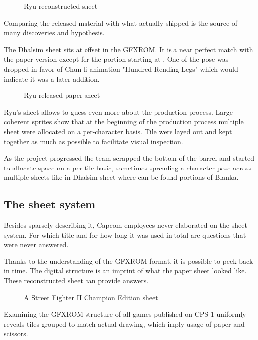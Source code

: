 \begin{figure}[H]
\caption*{Ryu reconstructed sheet}
\end{figure}


Comparing the released material with what actually shipped is the source of many discoveries and hypothesis. 

The Dhalsim sheet sits at offset  in the GFXROM. It is a near perfect match with the paper version except for the portion starting at . One of the pose was dropped in favor of Chun-li animation "Hundred Rending Legs" which would indicate it was a later addition. 

 \begin{figure}[H]
\caption*{Ryu released paper sheet}
\end{figure}

Ryu's sheet  allows to guess even more about the production process. Large coherent sprites show that at the beginning of the production process multiple sheet were allocated on a per-character basis. Tile were layed out and kept together as much as possible to facilitate visual inspection.

As the project progressed the team scrapped the bottom of the barrel and started to allocate space on a per-tile basic, sometimes spreading a character pose across multiple sheets like in Dhalsim sheet where can be found portions of Blanka.

\subsection{The sheet system}
Besides sparsely describing it, Capcom employees never elaborated on the sheet system. For which title and for how long it was used in total are questions that were never answered.

Thanks to the understanding of the GFXROM format, it is possible to peek back in time. The digital structure is an imprint of what the paper sheet looked like. These reconstructed sheet can provide answers.

 \begin{figure}[H]
\caption*{A Street Fighter II Champion Edition sheet}
\end{figure}

Examining the GFXROM structure of all games published on CPS-1 uniformly reveals tiles grouped to match actual drawing, which imply usage of paper and scissors.

